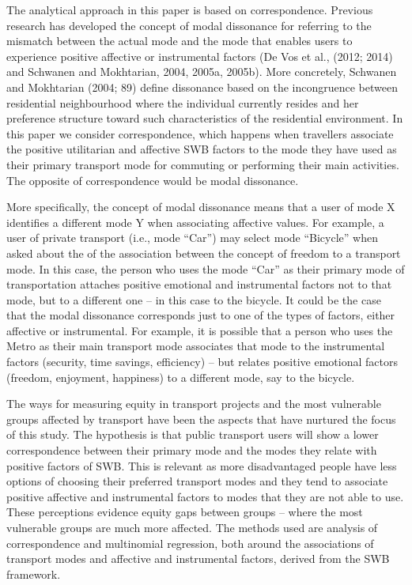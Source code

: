 \documentclass[]{elsarticle} %
\begin{document}
The analytical approach in this paper is based on correspondence.
Previous research has developed the concept of modal dissonance for
referring to the mismatch between the actual mode and the mode that
enables users to experience positive affective or instrumental factors
(De Vos et al., (2012; 2014) and Schwanen and Mokhtarian, 2004, 2005a,
2005b). More concretely, Schwanen and Mokhtarian (2004; 89) define
dissonance based on the incongruence between residential neighbourhood
where the individual currently resides and her preference structure
toward such characteristics of the residential environment. In this
paper we consider correspondence, which happens when travellers
associate the positive utilitarian and affective SWB factors to the mode
they have used as their primary transport mode for commuting or
performing their main activities. The opposite of correspondence would
be modal dissonance.

More specifically, the concept of modal dissonance means that a user of
mode X identifies a different mode Y when associating affective values.
For example, a user of private transport (i.e., mode ``Car'') may select
mode ``Bicycle'' when asked about the of the association between the
concept of freedom to a transport mode. In this case, the person who
uses the mode ``Car'' as their primary mode of transportation attaches
positive emotional and instrumental factors not to that mode, but to a
different one -- in this case to the bicycle. It could be the case that
the modal dissonance corresponds just to one of the types of factors,
either affective or instrumental. For example, it is possible that a
person who uses the Metro as their main transport mode associates that
mode to the instrumental factors (security, time savings, efficiency) --
but relates positive emotional factors (freedom, enjoyment, happiness)
to a different mode, say to the bicycle.

The ways for measuring equity in transport projects and the most
vulnerable groups affected by transport have been the aspects that have
nurtured the focus of this study. The hypothesis is that public
transport users will show a lower correspondence between their primary
mode and the modes they relate with positive factors of SWB. This is
relevant as more disadvantaged people have less options of choosing
their preferred transport modes and they tend to associate positive
affective and instrumental factors to modes that they are not able to
use. These perceptions evidence equity gaps between groups -- where the
most vulnerable groups are much more affected. The methods used are
analysis of correspondence and multinomial regression, both around the
associations of transport modes and affective and instrumental factors,
derived from the SWB framework.
\end{document}
